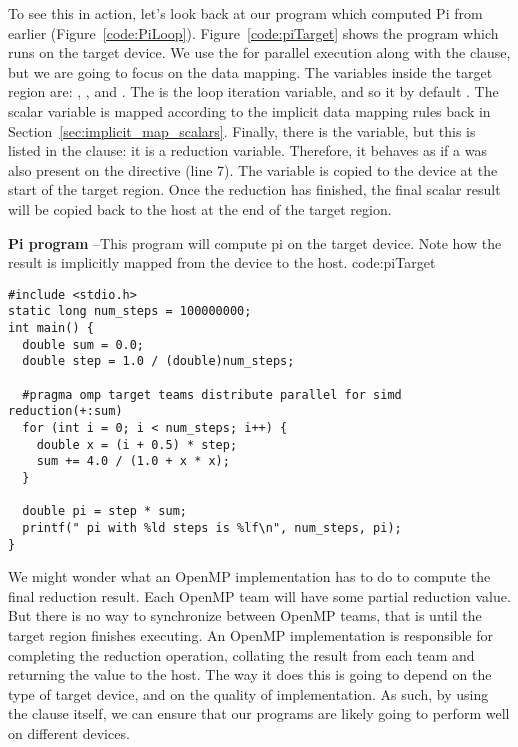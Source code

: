 To see this in action, let's look back at our program which computed Pi from earlier (Figure~\ref{code:PiLoop}).
Figure~\ref{code:piTarget} shows the program which runs on the target device.
We use the \BUD for parallel execution along with the  clause, but we are going to focus on the data mapping.
The variables inside the target region are: , , and .
The  is the loop iteration variable, and so it by default .
The  scalar variable is mapped  according to the implicit data mapping rules back in Section~\ref{sec:implicit_map_scalars}.
Finally, there is the  variable, but this is listed in the  clause: it is a reduction variable.
Therefore, it behaves as if a  was also present on the directive (line 7).
The variable is copied to the device at the start of the target region.
Once the reduction has finished, the final scalar result will be copied back to the host at the end of the target region.

\begin{CodeExample}%
{\textbf{Pi program} --\small This program will compute pi on the target device.
Note how the result is implicitly mapped from the device to the host.
}%
{code:piTarget}
\begin{lstlisting}
#include <stdio.h>
static long num_steps = 100000000;
int main() {
  double sum = 0.0;
  double step = 1.0 / (double)num_steps;

  #pragma omp target teams distribute parallel for simd reduction(+:sum)
  for (int i = 0; i < num_steps; i++) {
    double x = (i + 0.5) * step;
    sum += 4.0 / (1.0 + x * x);
  }

  double pi = step * sum;
  printf(" pi with %ld steps is %lf\n", num_steps, pi);
}
\end{lstlisting}
\end{CodeExample}

We might wonder what an OpenMP implementation has to do to compute the final reduction result.
Each OpenMP team will have some partial reduction value.
But there is no way to synchronize between OpenMP teams, that is until the target region finishes executing.
An OpenMP implementation is responsible for completing the reduction operation, collating the result from each team and returning the value to the host.
The way it does this is going to depend on the type of target device, and on the quality of implementation.
As such, by using the  clause itself, we can ensure that our programs are likely going to perform well on different devices.

